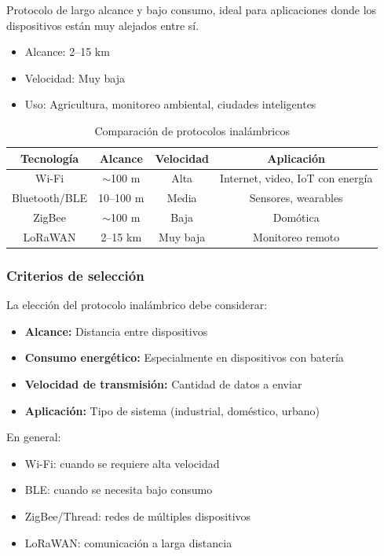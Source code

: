 \documentclass[conference]{IEEEtran}
\begin{document}
Protocolo de largo alcance y bajo consumo, ideal para aplicaciones donde los dispositivos están muy alejados entre sí.

\begin{itemize}
    \item Alcance: 2–15 km
    \item Velocidad: Muy baja
    \item Uso: Agricultura, monitoreo ambiental, ciudades inteligentes
\end{itemize}

\begin{table}[H]
\centering
\begin{tabular}{|c|c|c|c|}
\hline
Tecnología & Alcance & Velocidad & Aplicación \\
\hline
Wi-Fi & $\sim$100 m & Alta & Internet, video, IoT con energía \\
\hline
Bluetooth/BLE & 10–100 m & Media & Sensores, wearables \\
\hline
ZigBee & $\sim$100 m & Baja & Domótica \\
\hline
LoRaWAN & 2–15 km & Muy baja & Monitoreo remoto \\
\hline
\end{tabular}
\caption{Comparación de protocolos inalámbricos}
\end{table}

\subsubsection{Criterios de selección}

La elección del protocolo inalámbrico debe considerar:

\begin{itemize}
    \item \textbf{Alcance:} Distancia entre dispositivos
    \item \textbf{Consumo energético:} Especialmente en dispositivos con batería
    \item \textbf{Velocidad de transmisión:} Cantidad de datos a enviar
    \item \textbf{Aplicación:} Tipo de sistema (industrial, doméstico, urbano)
\end{itemize}

En general:
\begin{itemize}
    \item Wi-Fi: cuando se requiere alta velocidad
    \item BLE: cuando se necesita bajo consumo
    \item ZigBee/Thread: redes de múltiples dispositivos
    \item LoRaWAN: comunicación a larga distancia
\end{itemize}
\end{document}
